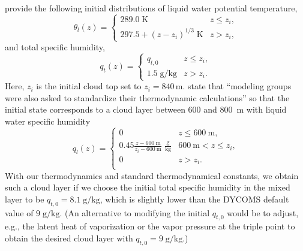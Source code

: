 \documentclass{report}
\begin{document}
\cite{Stevens05a} provide the following initial distributions of liquid water potential temperature,
\begin{equation}\label{e:dycoms1}
\theta_l(z) = 
    \begin{cases}
    289.0\;\mathrm{K} & z\leq z_i,\\
    297.5 + (z - z_i)^{1/3}\;\mathrm{K}& z > z_i,
    \end{cases}
\end{equation}
and total specific humidity, 
\begin{equation}\label{e:dycoms2}
q_t(z) = 
    \begin{cases}
    q_{t,0} & z\leq z_i,\\
    1.5\;\mathrm{g/kg} & z > z_i.
    \end{cases}
\end{equation}
Here, $z_i$ is the initial cloud top set to $z_i=840\,\mathrm{m}$. \cite{Stevens05a} state that ``modeling groups were also asked to standardize their thermodynamic calculations'' so that the initial state corresponds to a cloud layer between 600 and 800~m with liquid water specific humidity
\begin{equation}\label{e:dycoms3}
q_l(z) = 
    \begin{cases}
    0 & z\leq 600~\mathrm{m},\\
    0.45\frac{{}z - 600~\mathrm{m}}{z_i - 600~\mathrm{m}}\;\mathrm{\frac{g}{kg}}   & 600~\mathrm{m} < z \leq z_i,\\
    0 & z > z_i.\\
    \end{cases}
\end{equation}
With our thermodynamics and standard thermodynamical constants, we obtain such a cloud layer if we choose the initial total specific humidity in the mixed layer to be $q_{t,0} = 8.1\;\mathrm{g/kg}$, which is slightly lower than the DYCOMS default value of $9\;\mathrm{g/kg}$. (An alternative to modifying the initial $q_{t,0}$ would be to adjust, e.g., the latent heat of vaporization or the vapor pressure at the triple point to obtain the desired cloud layer with $q_{t,0} = 9\;\mathrm{g/kg}$.)
\end{document}

